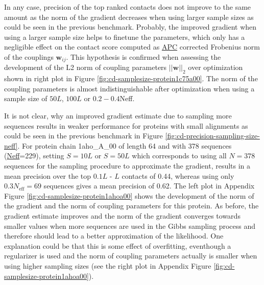 \documentclass[11pt,a4paper,twoside]{book}
\newcommand{\eq}{\!=\!}
\newcommand{\w}{\mathbf{w}}
\newcommand{\wij}{\mathbf{w}_{ij}}
\theoremstyle{definition}
\theoremstyle{definition}
\theoremstyle{remark}
\begin{document}
In any case, precision of the top ranked contacts does not improve to
the same amount as the norm of the gradient decreases when using larger
sample sizes as could be seen in the previous benchmark. Probably, the
improved gradient when using a larger sample size helps to finetune the
parameters, which only has a negligible effect on the contact score
computed as \protect\hyperlink{abbrev}{APC} corrected Frobenius norm of
the couplings \(\wij\). This hypothesis is confirmed when assessing the
development of the L2 norm of coupling parameters \(||\w||_2\) over
optimization shown in right plot in Figure
\ref{fig:cd-samplesize-protein1c75a00}. The norm of the coupling
parameters is almost indistinguishable after optimization when using a
sample size of \(50L\), \(100L\) or \(0.2 - 0.4\)Neff.

It is not clear, why an improved gradient estimate due to sampling more
sequences results in weaker performance for proteins with small
alignments as could be seen in the previous benchmark in Figure
\ref{fig:cd-precision-sampling-size-neff}. For protein chain 1aho\_A\_00
of length 64 and with 378 sequences
(\protect\hyperlink{abbrev}{Neff}=229), setting \(S=10L\) or \(S=50L\)
which corresponds to using all \(N \eq 378\) sequences for the sampling
procedure to approximate the gradient, results in a mean precision over
the top \(0.1L\) - \(L\) contacts of 0.44, whereas using only
\(0.3N_{\textrm{eff}} \eq 69\) sequences gives a mean precision of 0.62.
The left plot in Appendix Figure \ref{fig:cd-samplesize-protein1ahoa00}
shows the development of the norm of the gradient and the norm of
coupling parameters for this protein. As before, the gradient estimate
improves and the norm of the gradient converges towards smaller values
when more sequences are used in the Gibbs sampling process and therefore
should lead to a better approximation of the likelihood. One explanation
could be that this is some effect of overfitting, eventhough a
regularizer is used and the norm of coupling parameters actually is
smaller when using higher sampling sizes (see the right plot in Appendix
Figure \ref{fig:cd-samplesize-protein1ahoa00}).
\end{document}

